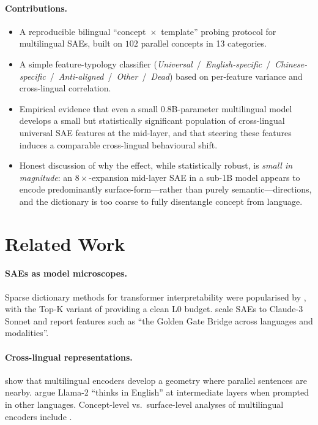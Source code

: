 \documentclass[11pt,a4paper]{article}
\begin{document}
\paragraph{Contributions.}
\begin{itemize}
\item A reproducible bilingual ``concept~$\times$~template'' probing protocol
for multilingual SAEs, built on $102$ parallel concepts in 13 categories.
\item A simple feature-typology classifier
(\emph{Universal}~/~\emph{English-specific}~/~\emph{Chinese-specific}~/~\emph{Anti-aligned}~/~\emph{Other}~/~\emph{Dead}) based on per-feature variance and cross-lingual
correlation.
\item Empirical evidence that even a small $0.8$B-parameter multilingual
model develops a small but statistically significant population of
cross-lingual universal SAE features at the mid-layer, and that steering
these features induces a comparable cross-lingual behavioural shift.
\item Honest discussion of why the effect, while statistically robust, is
\emph{small in magnitude}: an $8\times$-expansion mid-layer SAE in a
sub-1B model appears to encode predominantly surface-form---rather than
purely semantic---directions, and the dictionary is too coarse to fully
disentangle concept from language.
\end{itemize}

\section{Related Work}

\paragraph{SAEs as model microscopes.}
Sparse dictionary methods for transformer interpretability were popularised by
\cite{bricken2023monosemanticity,cunningham2023sparseautoencoders}, with the
Top-K variant of \cite{gao2024scalingsae} providing a clean L0 budget.
\cite{templeton2024scalingmonosemanticity} scale SAEs to Claude-3 Sonnet and
report features such as ``the Golden Gate Bridge across languages and modalities''.

\paragraph{Cross-lingual representations.}
\cite{conneau2020unsupervised} show that multilingual encoders develop a
geometry where parallel sentences are nearby. \cite{wendler2024llamasenglish}
argue Llama-2 ``thinks in English'' at intermediate layers when prompted in
other languages. Concept-level vs.\ surface-level analyses of multilingual
encoders include \cite{libovicky2020languageneutral}.
\end{document}
